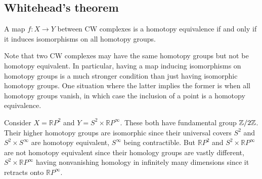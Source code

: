 \documentclass[12pt]{article}
\begin{document}
\subsection{Whitehead's theorem}
\begin{theorem}
    A map $f: X \to Y$ between CW complexes is a homotopy equivalence if and only if it induces isomorphisms on all homotopy groups.
\end{theorem}

Note that two CW complexes may have the same homotopy groups but not be homotopy equivalent. In particular, having a map inducing isomorphisms on homotopy groups is a much stronger condition than just having isomorphic homotopy groups. One situation where the latter implies the former is when all homotopy groups vanish, in which case the inclusion of a point is a homotopy equivalence.

\begin{example}
    Consider \(X=\mathbb{R}P^2\) and \(Y=S^2\times \mathbb{R}P^\infty\). These both have fundamental group \(\mathbb{Z}/2\mathbb{Z}\). Their higher homotopy groups are isomorphic since their universal covers \(S^2\) and \(S^2\times S^\infty\) are homotopy equivalent, \(S^\infty\) being contractible. But \(\mathbb{R}P^2\) and \(S^2\times \mathbb{R}P^\infty\) are not homotopy equivalent since their homology groups are vastly different, \(S^2\times \mathbb{R}P^\infty\) having nonvanishing homology in infinitely many dimensions since it retracts onto \(\mathbb{R}P^\infty\).
\end{example}
\end{document}
